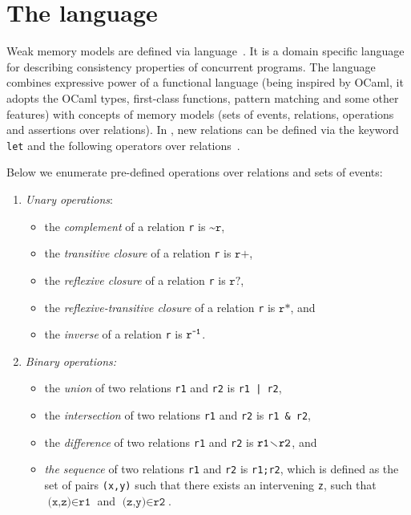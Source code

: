 \section{The \cat{} language}
\label{ch:wmm:cat}

Weak memory models are defined via \cat{} language~\cite{alglave2016syntax}.
It is a domain specific language for describing consistency properties of concurrent programs.
The language combines expressive power of a functional language (being inspired by OCaml, it adopts the OCaml types, first-class functions, pattern matching and some other features) with concepts of memory models (sets of events, relations, operations and assertions over relations).
In \cat{}, new relations can be defined via the keyword \texttt{let} and the following operators over relations~\cite{alglave2016syntax}.

Below we enumerate pre-defined operations over relations and sets of events:

\begin{enumerate}
  \item \textit{Unary operations}:
    \begin{itemize}
      \item the \textit{complement} of a relation \texttt{r} is $\texttt{\textasciitilde r}$,
      \item the \textit{transitive closure} of a relation \texttt{r} is $\texttt{r+}$,
      \item the \textit{reflexive closure} of a relation \texttt{r} is $\texttt{r?}$,
      \item the \textit{reflexive-transitive closure} of a relation \texttt{r} is $\texttt{r*}$, and
      \item the \textit{inverse} of a relation \texttt{r} is $\texttt{r}^{\texttt{-1}}$.
    \end{itemize}
  \item \textit{Binary operations:}
  \begin{itemize}
    \item the \textit{union} of two relations \texttt{r1} and \texttt{r2} is \texttt{r1\,|\,r2},
    \item the \textit{intersection} of two relations \texttt{r1} and \texttt{r2} is \texttt{r1\,\&\,r2},
      \item the \textit{difference} of two relations \texttt{r1} and \texttt{r2} is $\texttt{r1} \!\smallsetminus\! \texttt{r2}$, and
    \item \textit{the sequence} of two relations \texttt{r1} and \texttt{r2} is \texttt{r1;r2}, which is defined as the set of pairs \texttt{(x,y)} such that there exists an intervening \texttt{z}, such that $\texttt{(x,z)} \in \texttt{r1}$ and $\texttt{(z,y)} \in \texttt{r2}$.
  \end{itemize}
\end{enumerate}

